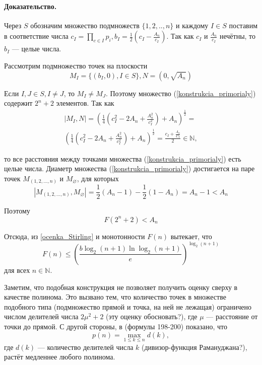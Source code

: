 \documentclass[a4paper,14pt]{article} %
\begin{document}
\paragraph{Доказательство.} Через $S$ обозначим множество подмножеств $\{1,2,..,n\}$ и каждому $I\in S$ поставим в соответствие числа $c_I=\prod\limits_{c\in I}p_i, b_I=\frac{1}{2}\left(c_I-\frac{A_n}{c_I}\right)$.
Так как $c_I$ и $\frac{A_n}{c_I}$ нечётны, то $b_I$ --- целые числа.

Рассмотрим подмножество точек на плоскости
\begin{equation}\label{konstrukcia_primorialy}
M_I=\{(b_I,0), I\in S\}, N=(0, \sqrt{A_n})
\end{equation}


Если $I,J \in S, I \neq J$, то $M_I \neq M_J$.
Поэтому множество (\ref{konstrukcia_primorialy}) содержит $2^n+2$ элементов.
Так как
\begin{multline*}
	|M_I,N|=\left(\frac{1}{4}\left( c_I^2 - 2 A_n + \frac{A_n^2}{c_I^2} \right)+A_n\right)^\frac{1}{2}=\\
	\left(\frac{1}{4}\left( c_I^2 - 2 A_n + \frac{A_n^2}{c_I^2} \right)+A_n\right)^\frac{1}{2}=
	\frac{c_I+\frac{A_n}{C_I}}{2} \in \mathbb{N},
\end{multline*}

то все расстояния между точками множества (\ref{konstrukcia_primorialy}) есть целые числа.
Диаметр множества (\ref{konstrukcia_primorialy}) достигается на паре точек $M_{(1,2,...,n)}$ и $M_{\varnothing}$, для которых
$$
|M_{(1,2,...,n)},M_{\varnothing}|=\frac{1}{2}(A_n-1)-\frac{1}{2}(1-A_n) = A_n-1 < A_n
$$

Поэтому 
$$
F(2^n+2) < A_n
$$

Отсюда, из \ref{ocenka_Stirling} и монотонности $F(n)$ вытекает, что
$$
F(n) \leq \left( \frac{b \log_2(n+1) \ln \log_2 (n+1)}{e}\right)^{\log_2(n+1)}
$$
для всех $n\in \mathbb{N}$.


Заметим, что подобная конструкция не позволяет получить оценку сверху в качестве полинома.
Это вызвано тем, что количество точек в множестве подобного типа (подмножество прямой и точка, на ней не лежащая) ограничено числом  делителей числа $2\mu^2+2$ (эту оценку обосновать?), где $\mu$ --- расстояние от точки до прямой.
С другой стороны, в \cite{Ramanujan} (формулы 198-200) показано, что
$$
p(n)=\max\limits_{1\leq k \leq n} d(k),
$$
где $d(k)$ --- количество делителей числа $k$ (дивизор-функция Рамануджана?),
растёт медленнее любого полинома.
\end{document}
